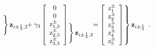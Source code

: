\begin{equation}
\begin{array}[c]{@{}l@{\,}l}
       \left.
       \begin{array}{c}
           \vphantom{\vdots}\\
           \vphantom{0}
       \end{array}
       \right\}
       &
       {\bz_{i \pm \half, 2}} \\
    \end{array}
    \hspace{-20.0\arrayrulewidth}
+
    \gamma_{3}
    \left[
        \begin{array}{c}
            0 \\
            0 \\
            \mathrm{z}_{1,3}^{\pm} \\
            \mathrm{z}_{2,3}^{\pm} \\
            \mathrm{z}_{3,3}^{\pm} \\
        \end{array}
    \right]
    \hspace{-30.0\arrayrulewidth}
    \begin{array}[c]{@{}l@{\,}l} \\ \\
       \left.
       \begin{array}{c}
           \vphantom{\vdots}\\
           \vphantom{0}
       \end{array}
       \right\}
       &
       {\bz_{i \pm \half, 3}}
    \end{array}
    \hspace{-20.0\arrayrulewidth}
=
    \left[
        \begin{array}{c}
            \mathrm{z}_{1}^{\pm} \\
            \mathrm{z}_{2}^{\pm} \\
            \mathrm{z}_{3}^{\pm} \\
            \mathrm{z}_{4}^{\pm} \\
            \mathrm{z}_{5}^{\pm} \\
        \end{array}
    \right]
    \hspace{-30.0\arrayrulewidth}
    \begin{array}[c]{@{}l@{\,}l}
       \left.
       \begin{array}{c}
           \vphantom{0} \\
           \vphantom{\vdots} \\
           \vphantom{\vdots} \\
           \vphantom{0}
           \end{array}
       \right\}
       &
       \bz_{i \pm \half} \\
    \end{array}.
\end{equation}
